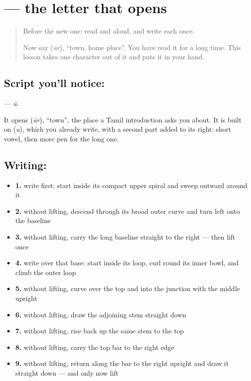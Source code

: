 \section[\texorpdfstring{\ta{ஊ} (ū)}{ஊ (ū)}]{ — the letter that opens }

\label{lesson:TA-S138-letter-uu}



\begin{quote}
Before the new one: read  and  aloud, and write each once.

Now say \textbf{} (\emph{ūr}), \textquotedblleft{}town, home place\textquotedblright{}. You have read it for a long time. This lesson takes one character out of it and puts it in your hand.
\end{quote}

\subsection*{Script you'll notice: }
\textbf{} — \emph{ū}.

It opens \textbf{} (\emph{ūr}), \textquotedblleft{}town\textquotedblright{}, the place a Tamil introduction asks you about. It is built on \textbf{} (\emph{u}), which you already write, with a second part added to its right: short vowel, then more pen for the long one.

\subsection*{Writing: }

\begin{itemize}
\raggedright
  \item \textbf{1.} write  first: start inside its compact upper spiral and sweep outward around it
  \item \textbf{2.} without lifting, descend through its broad outer curve and turn left onto the baseline
  \item \textbf{3.} without lifting, carry the long baseline straight to the right — then lift once
  \item \textbf{4.} write  over that base: start inside its loop, curl round its inner bowl, and climb the outer loop
  \item \textbf{5.} without lifting, curve over the top and into the junction with the middle upright
  \item \textbf{6.} without lifting, draw the adjoining stem straight down
  \item \textbf{7.} without lifting, rise back up the same stem to the top
  \item \textbf{8.} without lifting, carry the top bar to the right edge
  \item \textbf{9.} without lifting, return along the bar to the right upright and draw it straight down — and only now lift
\end{itemize}

